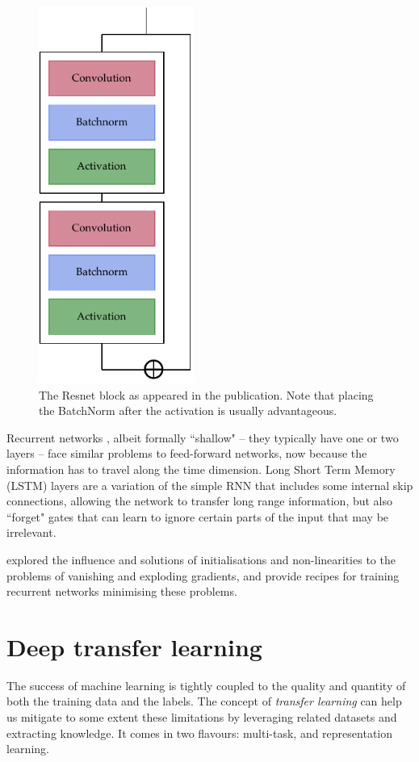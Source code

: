 \begin{figure}[!htb]
	\centering
	\includegraphics[width=0.45\textwidth]{machine_learning/figures/resnet}
	\caption{The Resnet block as appeared in the publication.
	Note that placing the BatchNorm after the activation is usually advantageous.}\label{fig:resnet}
\end{figure}

Recurrent networks , albeit formally ``shallow" -- they typically have one or two layers -- face similar problems to feed-forward networks, now because the information has to travel along the time dimension.
Long Short Term Memory (LSTM) layers are a variation of the simple RNN that includes some internal skip connections, allowing the network to transfer long range information, but also ``forget" gates that can learn to ignore certain parts of the input that may be irrelevant.

\citet{difficult_recurrent} explored the influence and solutions of initialisations and non-linearities to the problems of vanishing and exploding gradients, and provide recipes for training recurrent networks minimising these problems.


\section{Deep transfer learning}
The success of machine learning is tightly coupled to the quality and quantity of both the training data and the labels.
The concept of \emph{transfer learning} can help us mitigate to some extent these limitations by leveraging related datasets and extracting knowledge.
It comes in two flavours: multi-task, and representation learning.

